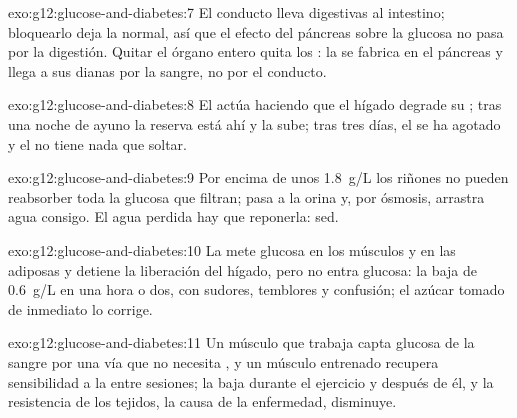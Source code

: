 \begin{solution}{exo:g12:glucose-and-diabetes:7}
El conducto lleva  digestivas al intestino; bloquearlo deja la
 normal, así que el efecto del páncreas sobre la glucosa no
pasa por la digestión. Quitar el órgano entero quita los : la
 se fabrica en el páncreas y llega a sus dianas por la sangre,
no por el conducto.
\end{solution}

\begin{solution}{exo:g12:glucose-and-diabetes:8}
El  actúa haciendo que el hígado degrade su ; tras una
noche de ayuno la reserva está ahí y la  sube; tras tres días,
el  se ha agotado y el  no tiene nada que soltar.
\end{solution}

\begin{solution}{exo:g12:glucose-and-diabetes:9}
Por encima de unos \qty{1.8}{g/L} los riñones no pueden reabsorber toda
la glucosa que filtran; pasa a la orina y, por ósmosis, arrastra agua
consigo. El agua perdida hay que reponerla: sed.
\end{solution}

\begin{solution}{exo:g12:glucose-and-diabetes:10}
La  mete glucosa en los músculos y en las  adiposas y
detiene la liberación del hígado, pero no entra glucosa: la 
baja de \qty{0.6}{g/L} en una hora o dos, con sudores, temblores y
confusión; el azúcar tomado de inmediato lo corrige.
\end{solution}

\begin{solution}{exo:g12:glucose-and-diabetes:11}
Un músculo que trabaja capta glucosa de la sangre por una vía que no
necesita , y un músculo entrenado recupera sensibilidad a la
 entre sesiones; la  baja durante el ejercicio y
después de él, y la resistencia de los tejidos, la causa de la
enfermedad, disminuye.
\end{solution}


